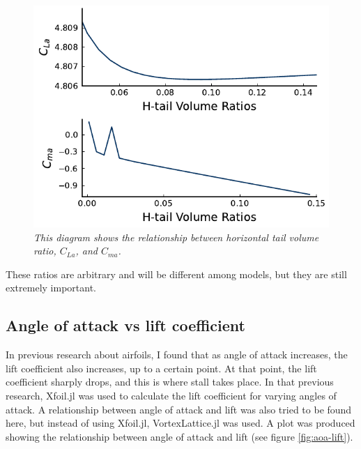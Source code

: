 \documentclass{journal}
\begin{document}
	\begin{figure}[H]
		\centering
		\includegraphics[scale=0.73]{../graphics/htail-stability.pdf}
		\caption{\emph{This diagram shows the relationship between horizontal tail volume ratio, \(C_{La}\), and \(C_{ma}\).}}
		\label{fig:htail-stability}
	\end{figure}
	
	These ratios are arbitrary and will be different among models, but they are still extremely important.\\
	
	\subsection{Angle of attack vs lift coefficient}
	
	In previous research about airfoils, I found that as angle of attack increases, the lift coefficient also increases, up to a certain point. At that point, the lift coefficient sharply drops, and this is where stall takes place. In that previous research, Xfoil.jl was used to calculate the lift coefficient for varying angles of attack. A relationship between angle of attack and lift was also tried to be found here, but instead of using Xfoil.jl, VortexLattice.jl was used. A plot was produced showing the relationship between angle of attack and lift (see figure \ref{fig:aoa-lift}).\\
	
\end{document}
